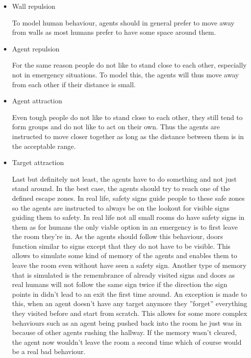 \documentclass[11pt]{article}
\begin{document}
\begin{itemize}
    \item Wall repulsion
    
    To model human behaviour, agents should in general prefer to move away from walls as most humans prefer to have some space around them.

    \item Agent repulsion
    
    For the same reason people do not like to stand close to each other, especially not in emergency situations. To model this, the agents will thus move away from each other if their distance is small.

    \item Agent attraction
    
    Even tough people do not like to stand close to each other, they still tend to form groups and do not like to act on their own. Thus the agents are instructed to move closer together as long as the distance between them is in the acceptable range.

    \item Target attraction
    
    Last but definitely not least, the agents have to do something and not just stand around. In the best case, the agents should try to reach one of the defined escape zones. In real life, safety signs guide people to these safe zones so the agents are instructed to always be on the lookout for visible signs guiding them to safety. In real life not all small rooms do have safety signs in them as for humans the only viable option in an emergency is to first leave the room they're in. As the agents should follow this behaviour, doors function similar to signs except that they do not have to be visible. This allows to simulate some kind of memory of the agents and enables them to leave the room even without have seen a safety sign. Another type of memory that is simulated is the remembrance of already visited signs and doors as real humans will not follow the same sign twice if the direction the sign points in didn't lead to an exit the first time around. An exception is made to this, when an agent doesn't have any target anymore they ''forget'' everything they visited before and start from scratch. This allows for some more complex behaviours such as an agent being pushed back into the room he just was in because of other agents rushing the hallway. If the memory wasn't cleared, the agent now wouldn't leave the room a second time which of course would be a real bad behaviour.
\end{itemize}
\end{document}
